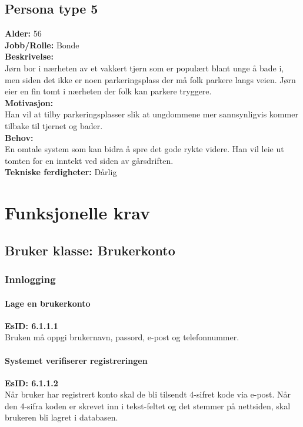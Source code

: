 \documentclass[12pt]{article}
\newcommand{\EsID}[1]{\textbf{EsID: #1}\\}
\begin{document}
    \subsection{Persona type 5}
    \textbf{Alder:} 56\\\textbf{Jobb/Rolle:} Bonde\\\textbf{Beskrivelse:}\\Jørn bor i nærheten av et vakkert tjern som er populært blant unge å bade i, men siden det ikke er noen parkeringsplass der må folk parkere langs veien. Jørn eier en fin tomt i nærheten der folk kan parkere tryggere.\\\textbf{Motivasjon:}\\Han vil at tilby parkeringsplasser slik at ungdommene mer sannsynligvis kommer tilbake til tjernet og bader.\\\textbf{Behov:}\\En omtale system som kan bidra å spre det gode rykte videre. Han vil leie ut tomten for en inntekt ved siden av gårsdriften.\\\textbf{Tekniske ferdigheter:} Dårlig

\section{Funksjonelle krav}

    \subsection{Bruker klasse: Brukerkonto}

        \subsubsection{Innlogging}
        
            \paragraph{Lage en brukerkonto}
            \EsID{6.1.1.1}
            Bruken må oppgi brukernavn, passord, e-post og telefonnummer.

            \paragraph{Systemet verifiserer registreringen}
            \EsID{6.1.1.2}
            Når bruker har registrert konto skal de bli tilsendt 4-sifret kode via e-post. Når den 4-sifra koden er skrevet inn i tekst-feltet og det stemmer på nettsiden, skal brukeren bli lagret i databasen.
\end{document}
